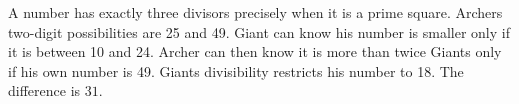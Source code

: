 A number has exactly three divisors precisely when it is a prime square. Archer\textquotesingle s two-digit possibilities are 25 and 49. Giant can know his number is smaller only if it is between 10 and 24. Archer can then know it is more than twice Giant\textquotesingle s only if his own number is 49. Giant\textquotesingle s divisibility restricts his number to 18. The difference is $\boxed{31}$.

